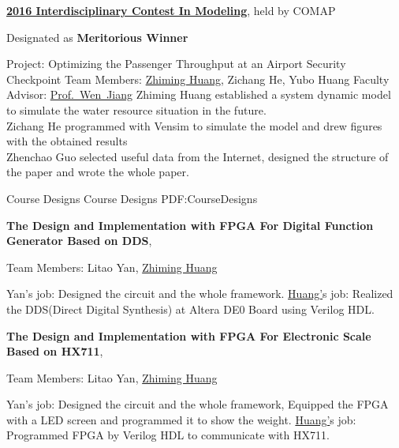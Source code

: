 \documentclass[letterpaper,MMMyyyy,nonstopmode]{simpleresumecv}
\begin{document}
\begin{Body}
\Entry
\href{http://www.comap.com/undergraduate/contests/}
{\textbf{2016 Interdisciplinary Contest In Modeling}},
held by COMAP

\Gap
\BulletItem
Designated as \textbf{Meritorious Winner}
\hfill
\begin{Detail}
\SubBulletItem
Project:
Optimizing the Passenger Throughput at an Airport Security Checkpoint
\SubBulletItem
Team Members:
\underline{Zhiming Huang}, Zichang He, Yubo Huang
\SubBulletItem
Faculty Advisor:
\href{http://teacher.nwpu.edu.cn/jiangwen.html}
{Prof.~Wen~Jiang}
\SubBulletItem
Zhiming Huang established a system dynamic model to simulate the water resource situation in the future.\\
Zichang He programmed with Vensim to simulate the model and drew figures with the obtained results\\
Zhenchao Guo selected useful data from the Internet, designed the structure of the paper and wrote the whole paper.
\end{Detail}




\Section
{Course \newline Designs}
{Course Designs}
{PDF:CourseDesigns}

\Entry
\textbf{The Design and Implementation with FPGA For Digital Function Generator Based on DDS},

\Gap
\BulletItem
Team Members: Litao Yan, \underline{Zhiming Huang}
\hfill
{}
\begin{Detail}
\SubBulletItem
Yan’s job: Designed the circuit and the whole framework.
\SubBulletItem
\underline{Huang'}s job: Realized the DDS(Direct Digital Synthesis) at Altera DE0 Board using Verilog HDL.
\end{Detail}
\BigGap
\Entry
\textbf{The Design and Implementation with FPGA For Electronic Scale Based on HX711},

\Gap
\BulletItem
Team Members: Litao Yan, \underline{Zhiming Huang}
\hfill
{}
\begin{Detail}
\SubBulletItem
Yan’s job: Designed the circuit and the whole framework, Equipped the FPGA with a LED screen and programmed it to show the weight.
\SubBulletItem
\underline{Huang'}s job: Programmed FPGA by Verilog HDL to communicate with HX711.
\end{Detail}



\end{Body}
\end{document}
